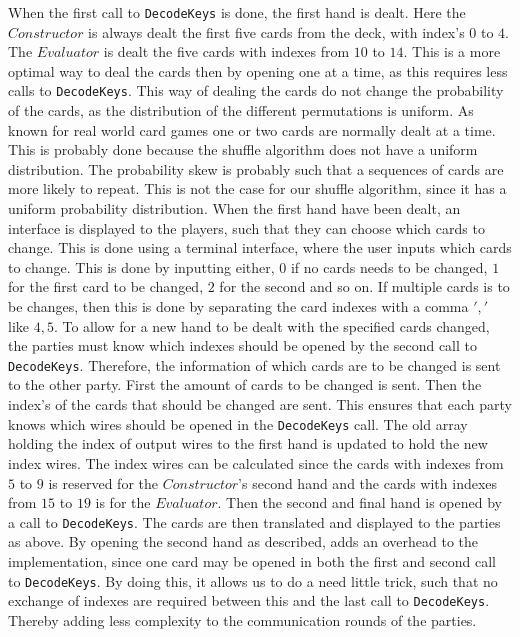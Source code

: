 \documentclass[twoside,11pt,openright]{report}
\begin{document}
When the first call to \verb|DecodeKeys| is done, the first hand is dealt. Here the $Constructor$ is always dealt the first five cards from the deck, with index's $0$ to $4$. The $Evaluator$ is dealt the five cards with indexes from $10$ to $14$. This is a more optimal way to deal the cards then by opening one at a time, as this requires less calls to \verb|DecodeKeys|. This way of dealing the cards do not change the probability of the cards, as the distribution of the different permutations is uniform. As known for real world card games one or two cards are normally dealt at a time. This is probably done because the shuffle algorithm does not have a uniform distribution. The probability skew is probably such that a sequences of cards are more likely to repeat. This is not the case for our shuffle algorithm, since it has a uniform probability distribution. When the first hand have been dealt, an interface is displayed to the players, such that they can choose which cards to change. This is done using a terminal interface, where the user inputs which cards to change. This is done by inputting either, $0$ if no cards needs to be changed, $1$ for the first card to be changed, $2$ for the second and so on. If multiple cards is to be changes, then this is done by separating the card indexes with a comma $','$ like $4,5$. To allow for a new hand to be dealt with the specified cards changed, the parties must know which indexes should be opened by the second call to \verb|DecodeKeys|. Therefore, the information of which cards are to be changed is sent to the other party. First the amount of cards to be changed is sent. Then the index's of the cards that should be changed are sent. This ensures that each party knows which wires should be opened in the \verb|DecodeKeys| call. The old array holding the index of output wires to the first hand is updated to hold the new index wires. The index wires can be calculated since the cards with indexes from $5$ to $9$ is reserved for the $Constructor$'s second hand and the cards with indexes from $15$ to $19$ is for the $Evaluator$. Then the second and final hand is opened by a call to \verb|DecodeKeys|. The cards are then translated and displayed to the parties as above. By opening the second hand as described, adds an overhead to the implementation, since one card may be opened in both the first and second call to \verb|DecodeKeys|. By doing this, it allows us to do a need little trick, such that no exchange of indexes are required between this and the last call to \verb|DecodeKeys|. Thereby adding less complexity to the communication rounds of the parties.
\end{document}
